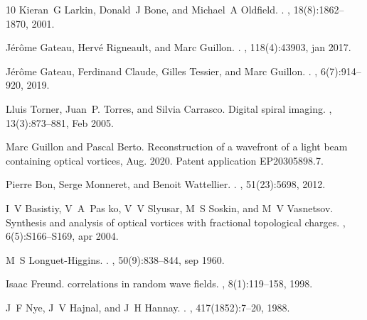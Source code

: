 \documentclass[10pt,twocolumn,twoside,letterpaper]{article}
\begin{document}
\begin{thebibliography}{10}
Kieran~G Larkin, Donald~J Bone, and Michael~A Oldfield.
.
, 18(8):1862--1870, 2001.

J{\'{e}}r{\^{o}}me Gateau, Herv{\'{e}} Rigneault, and Marc Guillon.
.
, 118(4):43903, jan 2017.

J{\'{e}}r{\^{o}}me Gateau, Ferdinand Claude, Gilles Tessier, and Marc Guillon.
.
, 6(7):914--920, 2019.

Lluis Torner, Juan~P. Torres, and Silvia Carrasco.
\newblock Digital spiral imaging.
, 13(3):873--881, Feb 2005.

Marc Guillon and Pascal Berto.
\newblock Reconstruction of a wavefront of a light beam containing optical
  vortices, Aug. 2020.
\newblock Patent application EP20305898.7.

Pierre Bon, Serge Monneret, and Benoit Wattellier.
.
, 51(23):5698, 2012.

I~V Basistiy, V~A~Pas ko, V~V Slyusar, M~S Soskin, and M~V Vasnetsov.
\newblock Synthesis and analysis of optical vortices with fractional
  topological charges.
, 6(5):S166--S169,
  apr 2004.

M~S Longuet-Higgins.
.
, 50(9):838--844, sep 1960.

Isaac Freund.
 correlations in random wave fields.
, 8(1):119--158, 1998.

J~F Nye, J~V Hajnal, and J~H Hannay.
.
, 417(1852):7--20,
  1988.

\end{thebibliography}
\end{document}
